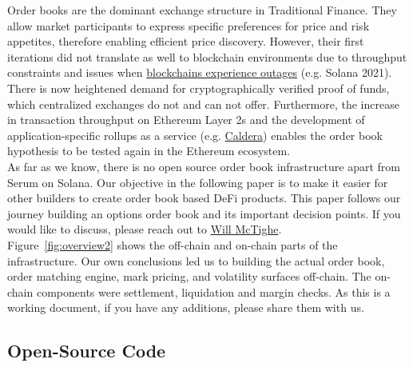 \documentclass{article}
\begin{document}
\noindent Order books are the dominant exchange structure in Traditional Finance. They allow market participants to express specific preferences for price and risk appetites, therefore enabling efficient price discovery. However, their first iterations did not translate as well to blockchain environments due to throughput constraints and issues when \href{https://angeris.github.io/papers/cfmm-ob.pdf}{blockchains experience outages} (e.g. Solana 2021). There is now heightened demand for cryptographically verified proof of funds, which centralized exchanges do not and can not offer. Furthermore, the increase in transaction throughput on Ethereum Layer 2s and the development of application-specific rollups as a service (e.g. \href{https://twitter.com/calderaxyz}{Caldera}) enables the order book hypothesis to be tested again in the Ethereum ecosystem. \\

\noindent As far as we know, there is no open source order book infrastructure apart from Serum on Solana. Our objective in the following paper is to make it easier for other builders to create order book based DeFi products. This paper follows our journey building an options order book and its important decision points. If you would like to discuss, please reach out to \href{https://twitter.com/WillMcTighe}{Will McTighe}. \\


\noindent Figure~\ref{fig:overview2} shows the off-chain and on-chain parts of the infrastructure. Our own conclusions led us to building the actual order book, order matching engine, mark pricing, and volatility surfaces off-chain. The on-chain components were settlement, liquidation and margin checks. As this is a working document, if you have any additions, please share them with us. \\

\subsection{Open-Source Code}
\end{document}
